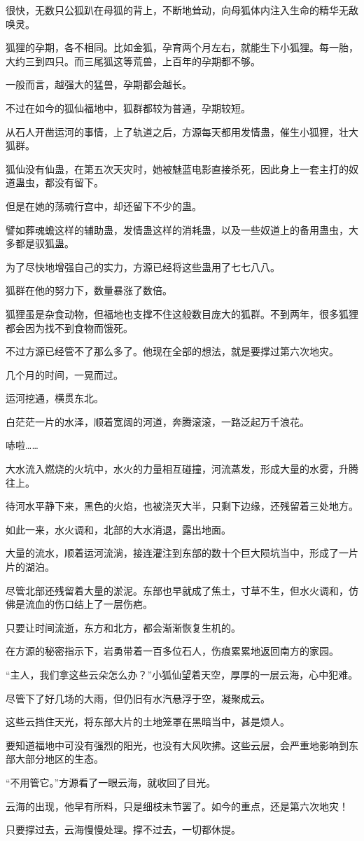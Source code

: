 \begin{this_body}
很快，无数只公狐趴在母狐的背上，不断地耸动，向母狐体内注入生命的精华无敌唤灵。

狐狸的孕期，各不相同。比如金狐，孕育两个月左右，就能生下小狐狸。每一胎，大约三到四只。而三尾狐这等荒兽，上百年的孕期都不够。

一般而言，越强大的猛兽，孕期都会越长。

不过在如今的狐仙福地中，狐群都较为普通，孕期较短。

从石人开凿运河的事情，上了轨道之后，方源每天都用发情蛊，催生小狐狸，壮大狐群。

狐仙没有仙蛊，在第五次天灾时，她被魅蓝电影直接杀死，因此身上一套主打的奴道蛊虫，都没有留下。

但是在她的荡魂行宫中，却还留下不少的蛊。

譬如葬魂蟾这样的辅助蛊，发情蛊这样的消耗蛊，以及一些奴道上的备用蛊虫，大多都是驭狐蛊。

为了尽快地增强自己的实力，方源已经将这些蛊用了七七八八。

狐群在他的努力下，数量暴涨了数倍。

狐狸虽是杂食动物，但福地也支撑不住这般数目庞大的狐群。不到两年，很多狐狸都会因为找不到食物而饿死。

不过方源已经管不了那么多了。他现在全部的想法，就是要撑过第六次地灾。

几个月的时间，一晃而过。

运河挖通，横贯东北。

白茫茫一片的水泽，顺着宽阔的河道，奔腾滚滚，一路泛起万千浪花。

哧啦……

大水流入燃烧的火坑中，水火的力量相互碰撞，河流蒸发，形成大量的水雾，升腾往上。

待河水平静下来，黑色的火焰，也被浇灭大半，只剩下边缘，还残留着三处地方。

如此一来，水火调和，北部的大水消退，露出地面。

大量的流水，顺着运河流淌，接连灌注到东部的数十个巨大陨坑当中，形成了一片片的湖泊。

尽管北部还残留着大量的淤泥。东部也早就成了焦土，寸草不生，但水火调和，仿佛是流血的伤口结上了一层伤疤。

只要让时间流逝，东方和北方，都会渐渐恢复生机的。

在方源的秘密指示下，岩勇带着一百多位石人，伤痕累累地返回南方的家园。

“主人，我们拿这些云朵怎么办？”小狐仙望着天空，厚厚的一层云海，心中犯难。

尽管下了好几场的大雨，但仍旧有水汽悬浮于空，凝聚成云。

这些云挡住天光，将东部大片的土地笼罩在黑暗当中，甚是烦人。

要知道福地中可没有强烈的阳光，也没有大风吹拂。这些云层，会严重地影响到东部大部分地区的生态。

“不用管它。”方源看了一眼云海，就收回了目光。

云海的出现，他早有所料，只是细枝末节罢了。如今的重点，还是第六次地灾！

只要撑过去，云海慢慢处理。撑不过去，一切都休提。

\end{this_body}

